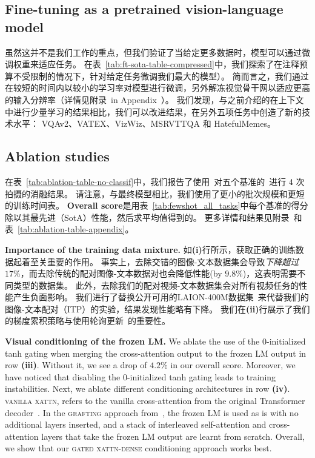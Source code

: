 \subsection{Fine-tuning \largem{} as a pretrained vision-language model}
\label{sec:ft_results}

虽然这并不是我们工作的重点，但我们验证了当给定更多数据时，\method{}模型可以通过微调权重来适应任务。
在表~\ref{tab:ft-sota-table-compressed}中，我们探索了在注释预算不受限制的情况下，针对给定任务微调我们最大的模型\largem{}）。
简而言之，我们通过在较短的时间内以较小的学习率对模型进行微调，另外解冻视觉骨干网以适应更高的输入分辨率（详情见附录~in Appendix~）。
我们发现，与之前介绍的在上下文中进行少量学习的结果相比，我们可以改进结果，在另外五项任务中创造了新的技术水平： VQAv2、VATEX、VizWiz、MSRVTTQA 和 HatefulMemes。



\subsection{Ablation studies}
\label{sec:ablations}



在表~\ref{tab:ablation-table-no-classif}中，我们报告了使用\base{}~对五个\dev{}基准的\metadevsubsets~进行 4 次拍摄的消融结果。
请注意，与最终模型相比，我们使用了更小的批次规模和更短的训练时间表。
\textbf{Overall score}是用表~\ref{tab:fewshot_all_tasks}中每个基准的得分除以其最先进（SotA）性能，然后求平均值得到的。
更多详情和结果见附录~和表~\ref{tab:ablation-table-appendix}。

\noindent
\textbf{Importance of the training data mixture.}
如\textbf{(i)}行所示，获取正确的训练数据起着至关重要的作用。
事实上，去除交错的图像-文本数据集\mmmw{}会导致\emph{下降超过$17\%$}，而去除传统的配对图像-文本数据对也会降低性能(by $9.8\%$)，这表明需要不同类型的数据集。
此外，去除我们的配对视频-文本数据集会对所有视频任务的性能产生负面影响。 
我们进行了替换公开可用的LAION-400M数据集~\cite{schuhmann2021laion}来代替我们的图像-文本配对（ITP）的实验，结果发现性能略有下降。
我们在\textbf{(ii)}行展示了我们的梯度累积策略与使用轮询更新~\citep{cho2021unifying}的重要性。

\noindent   
\textbf{Visual conditioning of the frozen LM.}
We ablate the use of the 0-initialized tanh gating when merging the cross-attention output to the frozen LM output in row \textbf{(iii)}.
Without it, we see a drop of $4.2\%$ in our overall score.
Moreover, we have noticed that disabling the 0-initialized tanh gating leads to training instabilities.
Next, we ablate different conditioning architectures in row \textbf{(iv)}.
\textsc{vanilla xattn}, refers to the vanilla cross-attention from the original Transformer decoder~\citep{vaswani2017attention}.
In the \textsc{grafting} approach from~\cite{luo2022vc}, the frozen LM is used as is with no additional layers inserted, and a stack of interleaved self-attention and cross-attention layers that take the frozen LM output are learnt from scratch.
Overall, we show that our \textsc{gated xattn-dense} conditioning approach works best.

